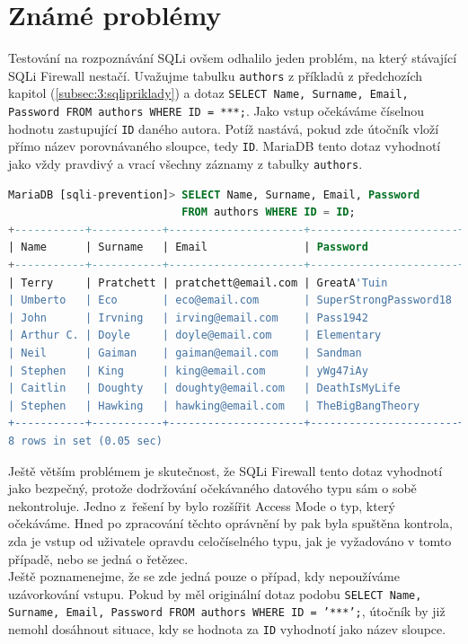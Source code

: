 \section{Známé problémy} \label{sec:7:problemy}
Testování na rozpoznávání SQLi ovšem odhalilo jeden problém, na který stávající SQLi Firewall nestačí. Uvažujme tabulku \texttt{authors}
z příkladů z předchozích kapitol (\ref{subsec:3:sqlipriklady}) a dotaz 
\texttt{SELECT Name, Surname, Email, Password FROM authors WHERE ID = ***;}.
Jako vstup očekáváme číselnou hodnotu zastupující \texttt{ID} daného autora. Potíž nastává, pokud zde útočník vloží přímo název
porovnávaného sloupce, tedy \texttt{ID}. MariaDB tento dotaz vyhodnotí jako vždy pravdivý a vrací všechny záznamy z tabulky \texttt{authors}.

\begin{lstlisting}[language=sql]
MariaDB [sqli-prevention]> SELECT Name, Surname, Email, Password 
                           FROM authors WHERE ID = ID; 
+-----------+-----------+---------------------+-----------------------+
| Name      | Surname   | Email               | Password              |
+-----------+-----------+---------------------+-----------------------+
| Terry     | Pratchett | pratchett@email.com | GreatA'Tuin           |
| Umberto   | Eco       | eco@email.com       | SuperStrongPassword18 |
| John      | Irvning   | irving@email.com    | Pass1942              |
| Arthur C. | Doyle     | doyle@email.com     | Elementary            |
| Neil      | Gaiman    | gaiman@email.com    | Sandman               |
| Stephen   | King      | king@email.com      | yWg47iAy              |
| Caitlin   | Doughty   | doughty@email.com   | DeathIsMyLife         |
| Stephen   | Hawking   | hawking@email.com   | TheBigBangTheory      |
+-----------+-----------+---------------------+-----------------------+
8 rows in set (0.05 sec)
\end{lstlisting}

Ještě větším problémem je skutečnost, že SQLi Firewall tento dotaz vyhodnotí jako bezpečný, protože dodržování očekávaného datového typu
sám o sobě nekontroluje. Jedno z~řešení by bylo rozšířit Access Mode o typ, který očekáváme. Hned po zpracování těchto oprávnění by
pak byla spuštěna kontrola, zda je vstup od uživatele opravdu celočíselného typu, jak je vyžadováno v tomto případě, nebo se jedná o řetězec. \\

Ještě poznamenejme, že se zde jedná pouze o případ, kdy nepoužíváme uzávorkování vstupu. Pokud by měl originální dotaz podobu
\texttt{SELECT Name, Surname, Email, Password FROM authors WHERE ID = '***';}, útočník by již nemohl dosáhnout situace,
kdy se hodnota za \texttt{ID} vyhodnotí jako název sloupce.

